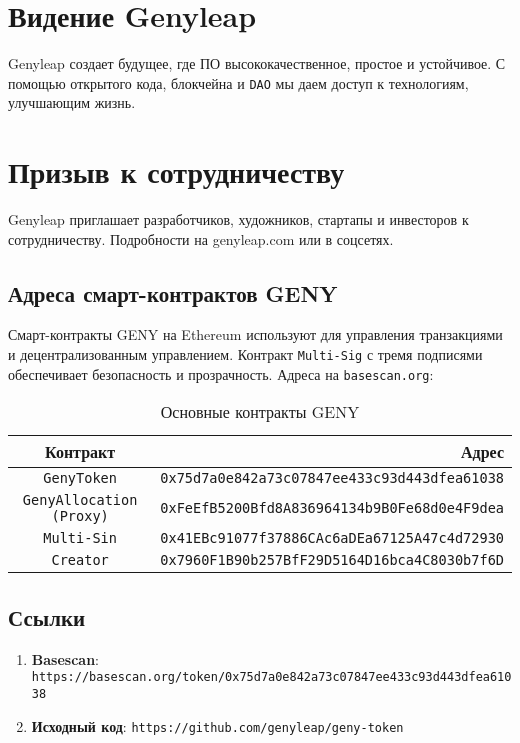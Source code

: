 \documentclass[a4paper,12pt,openany]{book}
\begin{document}
\chapter{Видение Genyleap}
Genyleap создает будущее, где ПО высококачественное, простое и устойчивое. С помощью открытого кода, блокчейна и \texttt{DAO} мы даем доступ к технологиям, улучшающим жизнь.

\chapter{Призыв к сотрудничеству}
Genyleap приглашает разработчиков, художников, стартапы и инвесторов к сотрудничеству. Подробности на genyleap.com или в соцсетях.

\section*{Адреса смарт-контрактов GENY}
Смарт-контракты GENY на Ethereum используют  для управления транзакциями и децентрализованным управлением. Контракт \texttt{Multi-Sig} с тремя подписями обеспечивает безопасность и прозрачность. Адреса на \texttt{basescan.org}:

\begin{table}[h]
\centering
\caption*{Основные контракты GENY}
\small
\begin{tabular}{c r}
\hline
\textbf{Контракт} & \textbf{Адрес} \\
\hline
\texttt{GenyToken} & {\texttt{0x75d7a0e842a73c07847ee433c93d443dfea61038}} \\
\texttt{GenyAllocation (Proxy)} & {\texttt{0xFeEfB5200Bfd8A836964134b9B0Fe68d0e4F9dea}} \\
\texttt{Multi-Sin} & {\texttt{0x41EBc91077f37886CAc6aDEa67125A47c4d72930}} \\
\texttt{Creator} & {\texttt{0x7960F1B90b257BfF29D5164D16bca4C8030b7f6D}} \\
\hline
\end{tabular}
\end{table}

\section*{Ссылки}

\begin{enumerate}
    \item \textbf{Basescan}: \texttt{https://basescan.org/token/0x75d7a0e842a73c07847ee433c93d443dfea61038}
    \item \textbf{Исходный код}: \texttt{https://github.com/genyleap/geny-token}
\end{enumerate}
\end{document}
